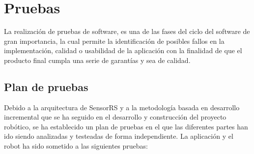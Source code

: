 

\newpage

\chapter{ Pruebas }
\label{chap:pruebas}

La realización de pruebas de software, es una de las fases del ciclo del software de gran importancia, la cual permite la identificación de posibles fallos en la implementación, 
calidad o usabilidad de la aplicación con la finalidad de que el producto final cumpla una serie de garantías y sea de calidad.\\

\section{Plan de pruebas}

Debido a la arquitectura de SensorRS y a la metodología basada en desarrollo incremental que se ha seguido en el desarrollo y construcción del proyecto robótico,
se ha establecido un plan de pruebas en el que las diferentes partes han ido siendo analizadas y testeadas de forma independiente. La aplicación y el robot ha sido sometido 
a las siguientes pruebas:\\

